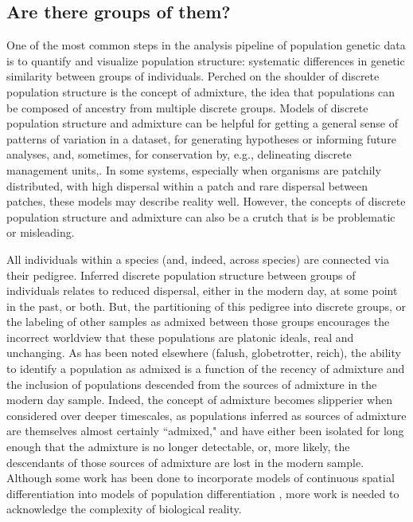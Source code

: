 \documentclass{ar-1col}
\newcommand{\todo}[1]{{\textbf{\color{red}{#1}}}}
\begin{document}
\todo{read through and edit}

\subsection{Are there groups of them?}
One of the most common steps in the analysis pipeline of population genetic data
is to quantify and visualize population structure:
systematic differences in genetic similarity between groups of individuals.
Perched on the shoulder of discrete population structure is the concept of admixture,
the idea that populations can be composed of ancestry from multiple discrete groups.
Models of discrete population structure and admixture 
can be helpful for getting a general sense of patterns of variation in a dataset, 
for generating hypotheses or informing future analyses, 
and, sometimes, for conservation by, 
e.g., delineating discrete management units,.
In some systems, 
especially when organisms are patchily distributed, 
with high dispersal within a patch and rare dispersal between patches,
these models may describe reality well.
However, 
the concepts of discrete population structure and admixture 
can also be a crutch that is be problematic or misleading.

All individuals within a species 
(and, indeed, across species) 
are connected via their pedigree.  
Inferred discrete population structure between groups of individuals 
relates to reduced dispersal, 
either in the modern day, at some point in the past, or both.
But, the partitioning of this pedigree into discrete groups, 
or the labeling of other samples as admixed between those groups
encourages the incorrect worldview that these populations are platonic ideals,
real and unchanging.
As has been noted elsewhere (falush, globetrotter, reich),
the ability to identify a population as admixed
is a function of the recency of admixture and
the inclusion of populations descended 
from the sources of admixture in the modern day sample.
Indeed, the concept of admixture becomes slipperier when considered over deeper timescales,
as populations inferred as sources of admixture are themselves almost certainly ``admixed,"
and have either been isolated for long enough that the admixture is no longer detectable,
or, more likely, the descendants of those sources of admixture are lost in the modern sample.
Although some work has been done to incorporate models of continuous spatial differentiation 
into models of population differentiation \cite{conStruct}, 
more work is needed to acknowledge the complexity of biological reality.
\end{document}
